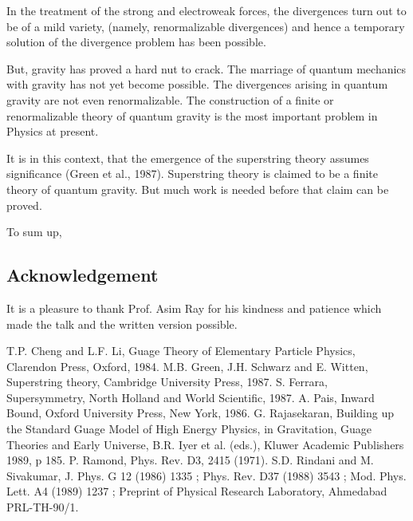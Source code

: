In the treatment of the strong and electroweak forces, the divergences turn out to be of a mild variety, (namely, renormalizable divergences) and hence a temporary solution of the divergence problem has been possible.

But, gravity has proved a hard nut to crack. The marriage of quantum mechanics with gravity has not yet become possible. The divergences arising in quantum gravity are not even renormalizable. The construction of a finite or renormalizable theory of quantum gravity is the most important problem in Physics at present.

It is in this context, that the emergence of the superstring theory assumes significance (Green et al., 1987). Superstring theory is claimed to be a finite theory of quantum gravity. But much work is needed before that claim can be proved.

To sum up,

{\fontsize{6}{8}}

\subsection*{Acknowledgement}

It is a pleasure to thank Prof. Asim Ray for his kindness and patience which made the talk and the written version possible.

\newpage


\begin{thebibliography}{99}
\itemsep=0pt
\bibitem{} T.P. Cheng and L.F. Li, Guage Theory of Elementary Particle Physics, Clarendon Press, Oxford, 1984.
\bibitem{} M.B. Green, J.H. Schwarz and E. Witten, Superstring theory, Cambridge University Press, 1987.
\bibitem{} S. Ferrara, Supersymmetry, North Holland and World Scientific, 1987.
\bibitem{} A. Pais, Inward Bound, Oxford University Press, New York, 1986.
\bibitem{} G. Rajasekaran, Building up the Standard Guage Model of High Energy Physics, in Gravitation, Guage Theories and Early Universe, B.R. Iyer et al. (eds.), Kluwer Academic Publishers 1989, p 185.
\bibitem{} P. Ramond, Phys. Rev. D3, 2415 (1971).
\bibitem{} S.D. Rindani and M. Sivakumar, J. Phys. G 12 (1986) 1335 ; Phys. Rev. D37 (1988) 3543 ; Mod. Phys. Lett. A4 (1989) 1237 ; Preprint of Physical Research Laboratory, Ahmedabad PRL-TH-90/1. 
\end{thebibliography}














